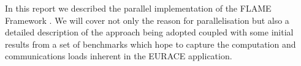 In this report we described the parallel implementation of the FLAME Framework \cite{Coakley}. We will cover not only the reason for parallelisation but also a detailed description of the approach being adopted coupled with some initial results from a set of benchmarks which hope to capture the computation and communications loads inherent in the EURACE application.